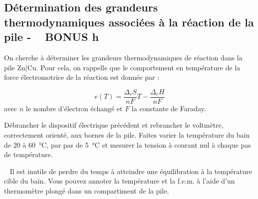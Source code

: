 \documentclass[twoside,a4paper,11pt,addpoints]{exam}%
\begin{document}

\newpage

\subsection{Détermination des grandeurs thermodynamiques associées à la réaction de la pile  - \faClockO ~ BONUS \si{\hour}}

On cherche à déterminer les grandeurs thermodynamiques de réaction dans la pile Zn|Cu. Pour cela, on rappelle que le comportement en température de la force électromotrice de la réaction est donnée par :

\begin{equation}
e (T) = \frac{\Delta_r S}{nF} T - \frac{\Delta_r H}{nF} 
\label{eq:e_T}
\end{equation}
avec $n$ le nombre d'électron échangé et $F$ la constante de Faraday.

Débrancher le dispositif électrique précédent et rebrancher le voltmètre, correctement orienté, aux bornes de la pile. Faites varier la température du bain de 20 à \SI{60}{\celsius}, par pas de \SI{5}{\celsius} et mesurer la tension à courant nul à chaque pas de température.

\faWarning ~ Il est inutile de perdre du temps à atteindre une équilibration à la température cible du bain. Vous pouvez annoter la température et la f.e.m. à l'aide d'un thermomètre plongé dans un compartiment de la pile.
\end{document}
